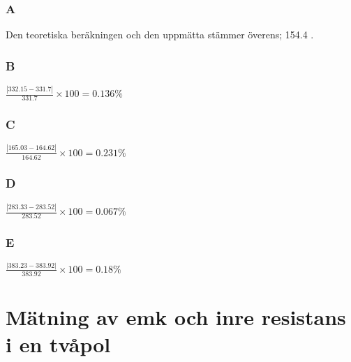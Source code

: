 \documentclass[11pt,a4paper]{article}
\begin{document}
\subsubsection{A}
Den teoretiska beräkningen och den uppmätta stämmer överens; 154.4 \ohm.
\subsubsection{B}
$\frac{|332.15 - 331.7|}{331.7}\times 100 = 0.136\%$
\subsubsection{C}
$\frac{|165.03 - 164.62|}{164.62}\times 100 = 0.231\%$
\subsubsection{D}
$\frac{|283.33 - 283.52|}{283.52}\times 100 = 0.067\%$
\subsubsection{E}
$\frac{|383.23 - 383.92|}{383.92}\times 100 = 0.18\%$
\section{Mätning av emk och inre resistans i en tvåpol}\label{measure_emk}
\end{document}
